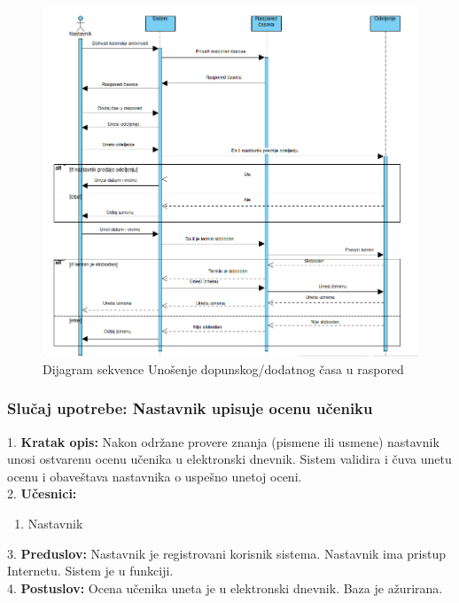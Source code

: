 \documentclass{article}
\begin{document}
\begin{figure} [!ht]
    \begin{center}
        \includegraphics[scale=0.4]{imgs/Dijagram_sekvence_nastavnik_dodaje_cas.png}
    \end{center}
\caption{Dijagram sekvence Unošenje dopunskog/dodatnog časa u raspored}
\end{figure}


\newpage
\subsubsection{Slučaj upotrebe: Nastavnik upisuje ocenu učeniku} 
1. \textbf{Kratak opis:} Nakon održane provere znanja (pismene ili usmene) nastavnik unosi ostvarenu ocenu učenika u elektronski dnevnik. Sistem validira i čuva unetu ocenu i obaveštava nastavnika o uspešno unetoj oceni.  \\

2. \textbf{Učesnici:}
\begin{enumerate} [label=(\alph*)]
\item Nastavnik
\end{enumerate} 

3. \textbf{Preduslov:} Nastavnik je registrovani korisnik sistema. Nastavnik ima pristup Internetu. Sistem je u funkciji. \\

4. \textbf{Postuslov:} Ocena učenika uneta je u elektronski dnevnik. Baza je ažurirana.\\
\end{document}
